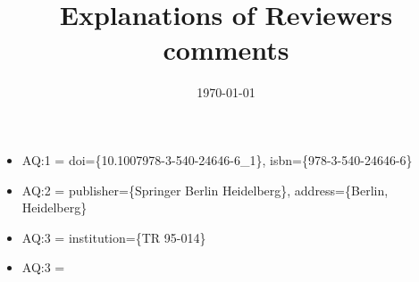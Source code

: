 \documentclass[11pt]{article}
\title{Explanations of Reviewers comments}
\date{\today}
\begin{document}
\begin{itemize}
	\item AQ:1 = doi=\{10.1007\/978-3-540-24646-6\_1\}, isbn=\{978-3-540-24646-6\}
	\item AQ:2 = publisher=\{Springer Berlin Heidelberg\}, address=\{Berlin, Heidelberg\}
	\item AQ:3 = institution=\{TR 95-014\}
	\item AQ:3 =
\end{itemize}
\end{document}
